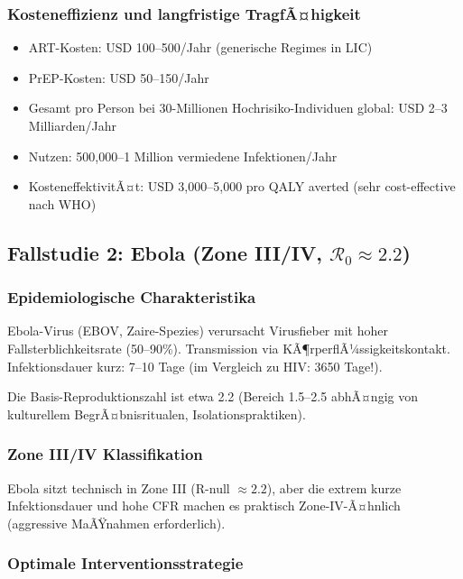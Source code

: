 ﻿\documentclass[a4paper,12pt,twoside]{article}
\theoremstyle{definition}
\begin{document}
\subsubsection{Kosteneffizienz und langfristige TragfÃ¤higkeit}

\begin{itemize}
\item ART-Kosten: USD 100--500/Jahr (generische Regimes in LIC)
\item PrEP-Kosten: USD 50--150/Jahr
\item Gesamt pro Person bei 30-Millionen Hochrisiko-Individuen global: USD 2--3 Milliarden/Jahr
\item Nutzen: 500,000--1 Million vermiedene Infektionen/Jahr
\item KosteneffektivitÃ¤t: USD 3,000--5,000 pro QALY averted (sehr cost-effective nach WHO)
\end{itemize}

\subsection{Fallstudie 2: Ebola (Zone III/IV, $\mathcal{R}_0 \approx 2.2$)}

\subsubsection{Epidemiologische Charakteristika}

Ebola-Virus (EBOV, Zaire-Spezies) verursacht Virusfieber mit hoher Fallsterblichkeitsrate (50--90\%). Transmission via KÃ¶rperflÃ¼ssigkeitskontakt. Infektionsdauer kurz: 7--10 Tage (im Vergleich zu HIV: 3650 Tage!).

Die Basis-Reproduktionszahl ist etwa 2.2 (Bereich 1.5--2.5 abhÃ¤ngig von kulturellem BegrÃ¤bnisritualen, Isolationspraktiken).

\subsubsection{Zone III/IV Klassifikation}

Ebola sitzt technisch in Zone III (R-null $\approx 2.2$), aber die extrem kurze Infektionsdauer und hohe CFR machen es praktisch Zone-IV-Ã¤hnlich (aggressive MaÃŸnahmen erforderlich).

\subsubsection{Optimale Interventionsstrategie}
\end{document}
